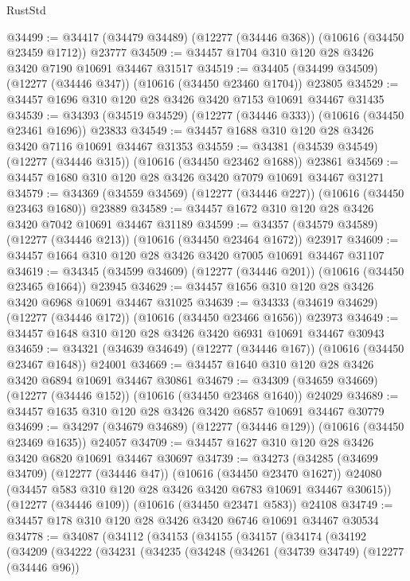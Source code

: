 \begin{lexlean}{RustStd}
\begin{coremodule}
@34499 := @34417 (@34479 @34489) (@12277 (@34446 @368)) (@10616 (@34450 @23459 @1712)) @23777
@34509 := @34457 @1704 @310 @120 @28 @3426 @3420 @7190 @10691 @34467 @31517
@34519 := @34405 (@34499 @34509) (@12277 (@34446 @347)) (@10616 (@34450 @23460 @1704)) @23805
@34529 := @34457 @1696 @310 @120 @28 @3426 @3420 @7153 @10691 @34467 @31435
@34539 := @34393 (@34519 @34529) (@12277 (@34446 @333)) (@10616 (@34450 @23461 @1696)) @23833
@34549 := @34457 @1688 @310 @120 @28 @3426 @3420 @7116 @10691 @34467 @31353
@34559 := @34381 (@34539 @34549) (@12277 (@34446 @315)) (@10616 (@34450 @23462 @1688)) @23861
@34569 := @34457 @1680 @310 @120 @28 @3426 @3420 @7079 @10691 @34467 @31271
@34579 := @34369 (@34559 @34569) (@12277 (@34446 @227)) (@10616 (@34450 @23463 @1680)) @23889
@34589 := @34457 @1672 @310 @120 @28 @3426 @3420 @7042 @10691 @34467 @31189
@34599 := @34357 (@34579 @34589) (@12277 (@34446 @213)) (@10616 (@34450 @23464 @1672)) @23917
@34609 := @34457 @1664 @310 @120 @28 @3426 @3420 @7005 @10691 @34467 @31107
@34619 := @34345 (@34599 @34609) (@12277 (@34446 @201)) (@10616 (@34450 @23465 @1664)) @23945
@34629 := @34457 @1656 @310 @120 @28 @3426 @3420 @6968 @10691 @34467 @31025
@34639 := @34333 (@34619 @34629) (@12277 (@34446 @172)) (@10616 (@34450 @23466 @1656)) @23973
@34649 := @34457 @1648 @310 @120 @28 @3426 @3420 @6931 @10691 @34467 @30943
@34659 := @34321 (@34639 @34649) (@12277 (@34446 @167)) (@10616 (@34450 @23467 @1648)) @24001
@34669 := @34457 @1640 @310 @120 @28 @3426 @3420 @6894 @10691 @34467 @30861
@34679 := @34309 (@34659 @34669) (@12277 (@34446 @152)) (@10616 (@34450 @23468 @1640)) @24029
@34689 := @34457 @1635 @310 @120 @28 @3426 @3420 @6857 @10691 @34467 @30779
@34699 := @34297 (@34679 @34689) (@12277 (@34446 @129)) (@10616 (@34450 @23469 @1635)) @24057
@34709 := @34457 @1627 @310 @120 @28 @3426 @3420 @6820 @10691 @34467 @30697
@34739 := @34273
    (@34285
      (@34699 @34709)
      (@12277 (@34446 @47))
      (@10616 (@34450 @23470 @1627))
      @24080
      (@34457 @583 @310 @120 @28 @3426 @3420 @6783 @10691 @34467 @30615))
    (@12277 (@34446 @109))
    (@10616 (@34450 @23471 @583))
    @24108
@34749 := @34457 @178 @310 @120 @28 @3426 @3420 @6746 @10691 @34467 @30534
@34778 := @34087
    (@34112
      (@34153
        (@34155
          (@34157
            (@34174
              (@34192
                (@34209
                  (@34222
                    (@34231
                      (@34235
                        (@34248
                          (@34261
                            (@34739 @34749)
                            (@12277 (@34446 @96))

\end{coremodule}
\end{lexlean}
